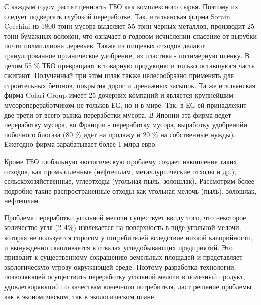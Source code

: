\begin{multicols}{2}
С каждым годом растет ценность ТБО как комплексного сырья. Поэтому их
следует подвергать глубокой переработке. Так, итальянская фирма Sorain
Cecchini из 1800 тонн мусора выделяет 55 тонн черных металлов,
производит 25 тонн бумажных волокон, что означает в годовом исчислении
спасение от вырубки почти полмиллиона деревьев. Также из пищевых отходов
делают гранулированное органическое удобрение, из пластика - полимерную
пленку. В целом 55 \% ТБО превращают в товарную продукцию и только
оставшуюся часть сжигают. Полученный при этом шлак также целесообразно
применять для строительных бетонов, покрытия дорог и дренажных засыпок.
Та же итальянская фирма Colari Group имеет 25 дочерних компаний и
является крупнейшим мусоропереработчиком не тольков ЕС, но и в мире.
Так, в ЕС ей принадлежит две трети от всего рынка переработки мусора. В
Японии эта фирма ведет переработку мусора, во Франции - переработку
мусора, выработку удобренийи побочного биогаза (80 \% идет на продажу и
20 \% на собственные нужды). Ежегодно фирма зарабатывает более 1 млрд
евро.

Кроме ТБО глобальную экологическую проблему создает накопление таких
отходов, как промышленные (нефтешлам, металлургические отходы и др.),
сельскохозяйственные, углеотходы (угольная пыль, золошлак). Рассмотрим
более подробно такие распространенные отходы как угольная мелочь (пыль),
золошлак, нефтешлам.

Проблема переработки угольной мелочи существует ввиду того, что
некоторое количество угля (2-4\%) извлекается на поверхность в виде
угольной мелочи, которая не пользуется спросом у потребителей вследствие
низкой калорийности, и вынужденно скапливается в отвалах угледобывающих
предприятий. Это приводит к существенному сокращению земельных площадей
и представляет экологическую угрозу окружающей среде. Поэтому разработка
технологии, позволяющей осуществить переработку угольной мелочи в
полезный продукт, удовлетворяющий по качествам конечного потребителя,
даст решение проблемы как в экономическом, так в экологическом плане.


\end{multicols}
